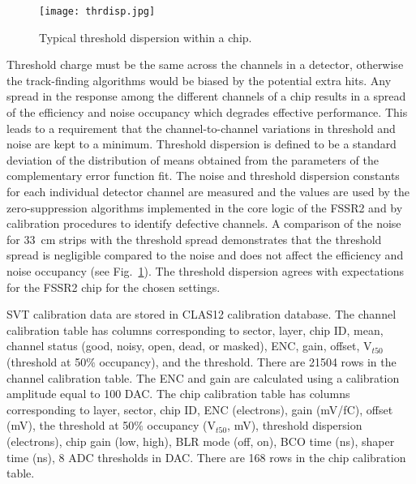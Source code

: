 \begin{figure}[hbt] 
	\centering 
	\texttt{[image: thrdisp.jpg]}
	\caption{Typical threshold dispersion within a chip.}
	\label{fig:thrdisp}
\end{figure}

Threshold charge must be the same across the channels in a detector, otherwise the track-finding algorithms would be biased by the potential extra hits. Any spread in the response among the different channels of a chip results in a spread of the efficiency and noise occupancy which degrades effective performance. This leads to a requirement that the channel-to-channel variations in threshold and noise are kept to a minimum. Threshold dispersion is defined to be a standard deviation of the distribution of means obtained from the parameters of the complementary error function fit. The noise and threshold dispersion constants for each individual detector channel are measured and the values are used by the zero-suppression algorithms implemented in the core logic of the FSSR2 and by calibration procedures to identify defective channels. A comparison of the noise for 33~cm strips with the threshold spread demonstrates that the threshold spread is negligible compared to the noise and does not affect the efficiency and noise occupancy (see Fig.~\ref{fig:thrdisp}). The threshold dispersion agrees with expectations for the FSSR2 chip for the chosen settings.

SVT calibration data are stored in CLAS12 calibration database. The channel calibration table has columns corresponding to sector, layer, chip ID, mean, channel status (good, noisy, open, dead, or masked), ENC, gain, offset, V$_{t50}$ (threshold at 50$\%$ occupancy), and the threshold. There are 21504 rows in the channel calibration table. The ENC and gain are calculated using a calibration amplitude equal to 100 DAC.
The chip calibration table has columns corresponding to layer, sector, chip ID, ENC (electrons), gain (mV/fC), offset (mV), the threshold at 50$\%$ occupancy (V$_{t50}$, mV), threshold dispersion (electrons), chip gain (low, high), BLR mode (off, on), BCO time (ns), shaper time (ns), 8 ADC thresholds in DAC. There are 168 rows in the chip calibration table. 

